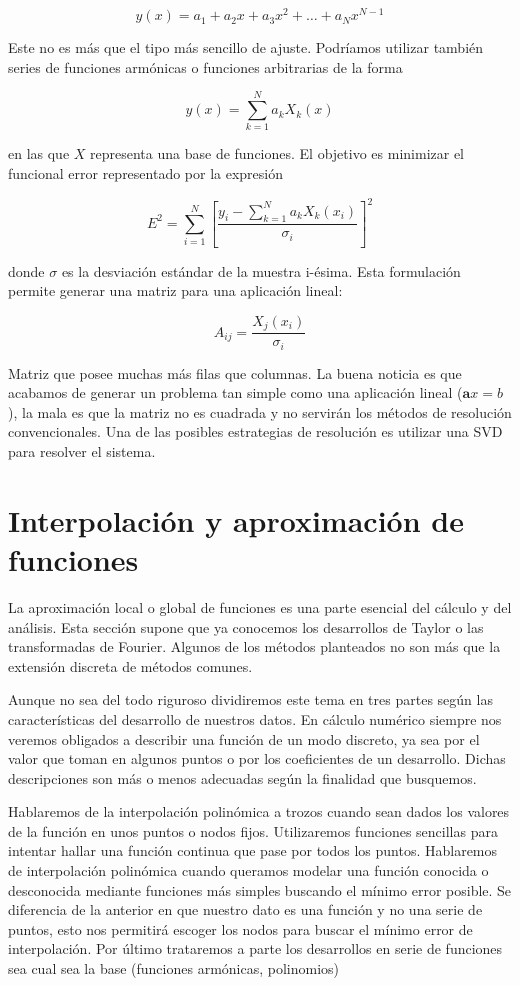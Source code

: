 $$
y(x)=a_{1}+a_{2}x+a_{3}x^{2}+\ldots+a_{N}x^{N-1}$$

Este no es más que el tipo más sencillo de ajuste. Podríamos utilizar
también series de funciones armónicas o funciones arbitrarias de la
forma

$$
y(x)=\sum_{k=1}^{N}a_{k}X_{k}(x)$$

en las que $X$ representa una base de funciones. El objetivo es
minimizar el funcional error representado por la expresión

$$
E^2=\sum_{i=1}^{N}\left[
  \frac{y_{i}-\sum_{k=1}^{N}a_{k}X_{k}(x_{i})}{\sigma_{i}}\right]^{2}
$$

donde $\sigma$ es la desviación estándar de la muestra i-ésima. Esta
formulación permite generar una matriz para una aplicación lineal:

$$
A_{ij}=\frac{X_{j}(x_{i})}{\sigma_{i}}$$

Matriz que posee muchas más filas que columnas. La buena noticia es
que acabamos de generar un problema tan simple como una aplicación
lineal ($\mathbf{a}x=b$), la mala es que la matriz no es cuadrada y no
servirán los métodos de resolución convencionales. Una de las posibles
estrategias de resolución es utilizar una SVD para resolver el
sistema.

\section{Interpolación y aproximación de funciones}

La aproximación local o global de funciones es una parte esencial del
cálculo y del análisis.  Esta sección supone que ya conocemos los
desarrollos de Taylor o las transformadas de Fourier.  Algunos de los
métodos planteados no son más que la extensión discreta de métodos
comunes.

Aunque no sea del todo riguroso dividiremos este tema en tres partes
según las características del desarrollo de nuestros datos.  En
cálculo numérico siempre nos veremos obligados a describir una función
de un modo discreto, ya sea por el valor que toman en algunos puntos o
por los coeficientes de un desarrollo.  Dichas descripciones son más o
menos adecuadas según la finalidad que busquemos.

Hablaremos de la interpolación polinómica a trozos cuando sean dados
los valores de la función en unos puntos o nodos fijos.  Utilizaremos
funciones sencillas para intentar hallar una función continua que pase
por todos los puntos.  Hablaremos de interpolación polinómica cuando
queramos modelar una función conocida o desconocida mediante funciones
más simples buscando el mínimo error posible.  Se diferencia de la
anterior en que nuestro dato es una función y no una serie de puntos,
esto nos permitirá escoger los nodos para buscar el mínimo error de
interpolación.  Por último trataremos a parte los desarrollos en serie
de funciones sea cual sea la base (funciones armónicas, polinomios)

